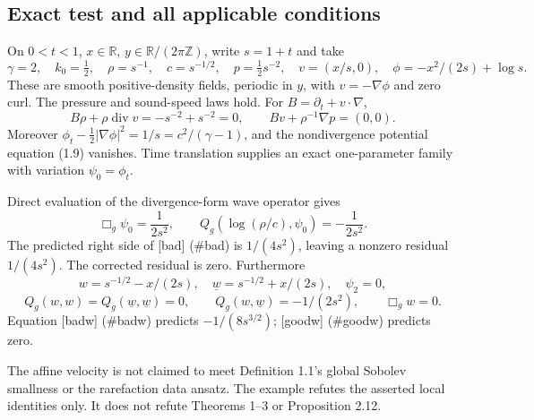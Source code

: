 \documentclass[10pt]{article}
\begin{document}
\subsection*{Exact test and all applicable conditions}
On \(0<t<1\), \(x\in\mathbb R\), \(y\in\mathbb R/(2\pi\mathbb Z)\), write \(s=1+t\) and take \[\gamma=2,\quad k_0=\tfrac12,\quad
\rho=s^{-1},\quad c=s^{-1/2},\quad p=\tfrac12s^{-2},\quad
v=(x/s,0),\quad
\phi=-x^2/(2s)+\log s .\] These are smooth positive-density fields, periodic in \(y\), with \(v=-\nabla\phi\) and zero curl. The pressure and sound-speed laws hold. For \(B=\partial_t+v\cdot\nabla\), \[B\rho+\rho\operatorname{div}v=-s^{-2}+s^{-2}=0,\qquad
Bv+\rho^{-1}\nabla p=(0,0).\] Moreover \(\phi_t-\frac12|\nabla\phi|^2=1/s=c^2/(\gamma-1)\), and the nondivergence potential equation (1.9) vanishes. Time translation supplies an exact one-parameter family with variation \(\psi_0=\phi_t\).\par
Direct evaluation of the divergence-form wave operator gives \[\Box_g\psi_0=\frac1{2s^2},\qquad
Q_g(\log(\rho/c),\psi_0)=-\frac1{2s^2}.\] The predicted right side of [bad] (\#bad) is \(1/(4s^2)\), leaving a nonzero residual \(1/(4s^2)\). The corrected residual is zero. Furthermore \[w=s^{-1/2}-x/(2s),\quad \underline{w}=s^{-1/2}+x/(2s),\quad \psi_2=0,\] \[Q_g(w,w)=Q_g(\underline{w},\underline{w})=0,\qquad
Q_g(w,\underline{w})=-1/(2s^2),\qquad
\Box_gw=0.\] Equation [badw] (\#badw) predicts \(-1/(8s^{3/2})\); [goodw] (\#goodw) predicts zero.\par
The affine velocity is not claimed to meet Definition 1.1’s global Sobolev smallness or the rarefaction data ansatz. The example refutes the asserted local identities only. It does not refute Theorems 1–3 or Proposition 2.12.\par
\end{document}
